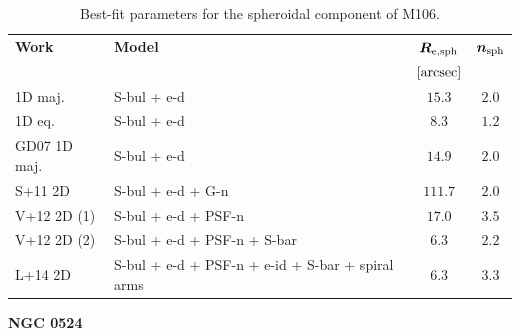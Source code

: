 \documentclass[preprint2]{emulateapj}
\begin{document}
  \begin{table}[h]
  \small
  \caption{Best-fit parameters for the spheroidal component of M106.}
  \begin{center}
  \begin{tabular}{llcc}
  \hline
  {\bf Work} & {\bf Model}   & $\bm R_{\rm e,sph}$    & $\bm n_{\rm sph}$ \\
    &  &  $[\rm arcsec]$ & \\
  \hline
  1D maj. & S-bul + e-d & $15.3$  &  $2.0$ \\
  1D eq.  & S-bul + e-d & $8.3$   &  $1.2$ \\
  \hline
  GD07 1D maj.     & S-bul + e-d		 & $14.9$   &  $2.0$ \\
  S+11 2D     & S-bul + e-d + G-n  	 & $111.7$  &  $2.0$ \\
  V+12 2D (1) & S-bul + e-d + PSF-n	 & $17.0$   &  $3.5$ \\
  V+12 2D (2) & S-bul + e-d + PSF-n + S-bar & $6.3$    &  $2.2$ \\
  L+14 2D     & S-bul + e-d + PSF-n + e-id + S-bar + spiral arms & $6.3$	 &  $3.3$ \\
  \hline
  \end{tabular}
  \end{center}
  \label{tab:m106}
  \end{table}


  \clearpage\newpage\noindent
  {\bf NGC 0524 \\} 
\end{document}
